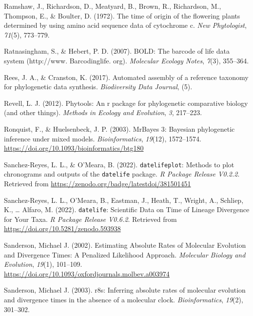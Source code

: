 \documentclass[
  man]{apa6}
\newlength{\cslhangindent}
\newlength{\cslentryspacingunit} %
\newenvironment{CSLReferences}[2] %
 {%
  \setlength{\parindent}{0pt}
  \ifodd #1
  \let\oldpar\par
  \def\par{\hangindent=\cslhangindent\oldpar}
  \fi
  \setlength{\parskip}{#2\cslentryspacingunit}
 }%
 {}
\begin{document}
\begin{CSLReferences}{1}{0}
\leavevmode{}%
Ramshaw, J., Richardson, D., Meatyard, B., Brown, R., Richardson, M., Thompson, E., \& Boulter, D. (1972). The time of origin of the flowering plants determined by using amino acid sequence data of cytochrome c. \emph{New Phytologist}, \emph{71}(5), 773--779.

\leavevmode{}%
Ratnasingham, S., \& Hebert, P. D. (2007). BOLD: The barcode of life data system (http://www. Barcodinglife. org). \emph{Molecular Ecology Notes}, \emph{7}(3), 355--364.

\leavevmode{}%
Rees, J. A., \& Cranston, K. (2017). Automated assembly of a reference taxonomy for phylogenetic data synthesis. \emph{Biodiversity Data Journal}, (5).

\leavevmode{}%
Revell, L. J. (2012). Phytools: An r package for phylogenetic comparative biology (and other things). \emph{{Methods in Ecology and Evolution}}, \emph{3}, 217--223.

\leavevmode{}%
Ronquist, F., \& Huelsenbeck, J. P. (2003). {MrBayes 3: Bayesian phylogenetic inference under mixed models}. \emph{Bioinformatics}, \emph{19}(12), 1572--1574. \url{https://doi.org/10.1093/bioinformatics/btg180}

\leavevmode{}%
Sanchez-Reyes, L. L., \& O'Meara, B. (2022). {\texttt{datelifeplot}: Methods to plot chronograms and outputs of the \texttt{datelife} package}. \emph{R Package Release V0.2.2}. Retrieved from \url{https://zenodo.org/badge/latestdoi/381501451}

\leavevmode{}%
Sanchez-Reyes, L. L., O'Meara, B., Eastman, J., Heath, T., Wright, A., Schliep, K., \ldots{} Alfaro, M. (2022). {\texttt{datelife}: Scientific Data on Time of Lineage Divergence for Your Taxa}. \emph{R Package Release V0.6.2}. Retrieved from \url{https://doi.org/10.5281/zenodo.593938}

\leavevmode{}%
Sanderson, Michael J. (2002). {Estimating Absolute Rates of Molecular Evolution and Divergence Times: A Penalized Likelihood Approach}. \emph{Molecular Biology and Evolution}, \emph{19}(1), 101--109. \url{https://doi.org/10.1093/oxfordjournals.molbev.a003974}

\leavevmode{}%
Sanderson, Michael J. (2003). r8s: Inferring absolute rates of molecular evolution and divergence times in the absence of a molecular clock. \emph{Bioinformatics}, \emph{19}(2), 301--302.


\end{CSLReferences}
\end{document}
